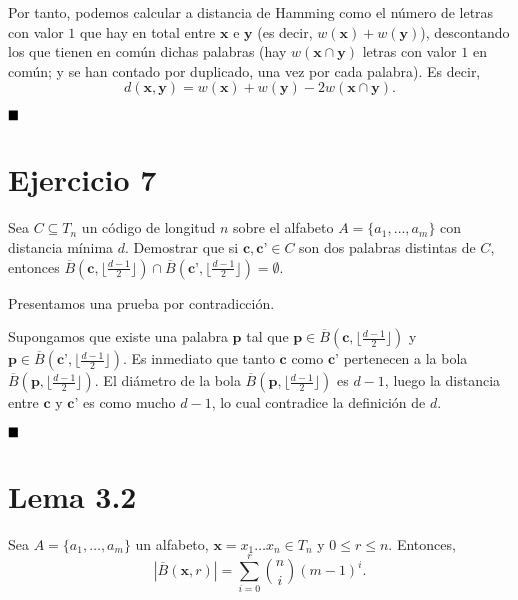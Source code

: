 Por tanto, podemos calcular a distancia de Hamming como el número de letras con valor $1$ que hay en total entre $\textbf{x}$ e $\textbf{y}$ (es decir, $w(\textbf{x}) + w(\textbf{y})$), descontando los que tienen en común dichas palabras (hay $w(\textbf{x}\cap\textbf{y})$ letras con valor $1$ en común; y se han contado por duplicado, una vez por cada palabra). Es decir, \[d(\textbf{x}, \textbf{y}) = w(\textbf{x}) + w(\textbf{y}) - 2w(\textbf{x}\cap\textbf{y}).\]

$\qed$

\section{Ejercicio 7}

\begin{formulationBox}
	Sea $C\subseteq T_n$ un código de longitud $n$ sobre el alfabeto $A = \{a_1,\hdots,a_m\}$ con distancia mínima $d$. Demostrar que si $\textbf{c}, \textbf{c'}\in C$ son dos palabras distintas de $C$, entonces $\overline{B}(\textbf{c}, \lfloor\frac{d-1}{2}\rfloor) \cap \overline{B}(\textbf{c'}, \lfloor\frac{d-1}{2}\rfloor) = \emptyset$.
\end{formulationBox}

Presentamos una prueba por contradicción.

Supongamos que existe una palabra $\textbf{p}$ tal que $\textbf{p}\in\overline{B}(\textbf{c}, \lfloor\frac{d-1}{2}\rfloor)$ y $\textbf{p}\in\overline{B}(\textbf{c'}, \lfloor\frac{d-1}{2}\rfloor)$. Es inmediato que tanto $\textbf{c}$ como $\textbf{c'}$ pertenecen a la bola $\overline{B}(\textbf{p}, \lfloor\frac{d-1}{2}\rfloor)$. El diámetro de la bola $\overline{B}(\textbf{p}, \lfloor\frac{d-1}{2}\rfloor)$ es $d-1$, luego la distancia entre $\textbf{c}$ y $\textbf{c'}$ es como mucho $d-1$, lo cual contradice la definición de $d$.

$\qed$

\section{Lema 3.2}

\begin{formulationBox}
	\begin{lemma}
		Sea $A = \{a_1,\hdots,a_m\}$ un alfabeto, $\textbf{x} = x_1\hdots x_n \in T_n$ y $0\leq r\leq n$. Entonces,
		\[|\overline{B}(\textbf{x}, r)| = \sum_{i=0}^r\binom{n}{i}(m-1)^i.\]
	\end{lemma}
\end{formulationBox}


